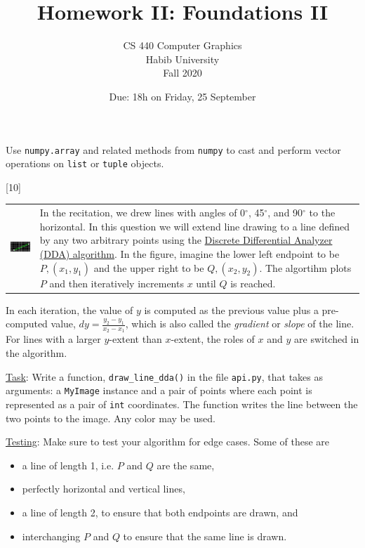 \documentclass[addpoints]{exam}
\title{Homework II: Foundations II}
\author{CS 440 Computer Graphics\\Habib University\\Fall 2020}
\date{Due: 18h on Friday, 25 September}
\begin{document}
\maketitle


Use \texttt{numpy.array} and related methods from \texttt{numpy} to cast and perform vector operations on \texttt{list} or \texttt{tuple} objects.

\begin{questions}
  
  [10]

  \noindent\begin{tabularx}{\linewidth}{lX}
    \includegraphics[align=t]{dda} &
    In the recitation, we drew lines with angles of 0$^\circ$, 45$^\circ$, and 90$^\circ$ to the horizontal. In this question we will extend line drawing to a line defined by any two arbitrary points using the \href{https://en.wikipedia.org/wiki/Digital_differential_analyzer_(graphics_algorithm)}{Discrete Differential Analyzer (DDA) algorithm}. In the figure, imagine the lower left endpoint to be $P, (x_1,y_1)$ and the upper right to be $Q, (x_2,y_2)$. The algortihm plots $P$ and then iteratively increments $x$ until $Q$ is reached.
  \end{tabularx}
  In each iteration, the value of $y$ is computed as the previous value plus a pre-computed value, $dy = \frac{y_2-y_1}{x_2-x_1}$, which is also called the \textit{gradient} or \textit{slope} of the line. For lines with a larger $y$-extent than $x$-extent, the roles of $x$ and $y$ are switched in the algorithm.
  
  \underline{Task}: Write a function, \texttt{draw\_line\_dda()} in the file \texttt{api.py}, that takes as arguments: a \texttt{MyImage} instance and a pair of points where each point is represented as a pair of \texttt{int} coordinates. The function writes the line between the two points to the image. Any color may be used.

  \underline{Testing}: Make sure to test your algorithm for edge cases. Some of these are
  \begin{itemize}
  \item a line of length 1, i.e. $P$ and $Q$ are the same,
  \item perfectly horizontal and vertical lines,
  \item a line of length 2, to ensure that both endpoints are drawn, and
  \item interchanging $P$ and $Q$ to ensure that the same line is drawn.
  \end{itemize}


\end{questions}
\end{document}
